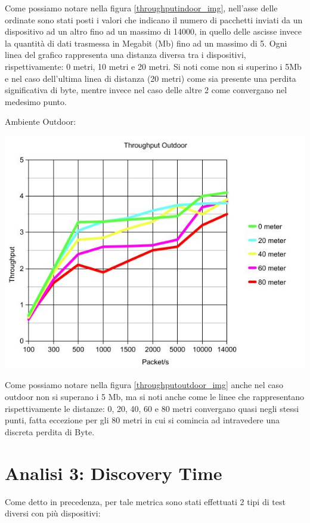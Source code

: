 Come possiamo notare nella figura \ref{throughputindoor_img}, nell'asse delle ordinate sono stati posti i valori che indicano il numero di pacchetti inviati da un dispositivo ad un altro fino ad un massimo di 14000, in quello delle ascisse invece la quantità di dati trasmessa in Megabit (Mb) fino ad un massimo di 5.
Ogni linea del grafico rappresenta una distanza diversa tra i dispositivi, rispettivamente: 0 metri, 10 metri e 20 metri.
Si noti come non si superino i 5Mb e nel caso dell'ultima linea di distanza (20 metri) come sia presente una perdita significativa di byte, mentre invece nel caso delle altre 2 come convergano nel medesimo punto.

Ambiente Outdoor:
\begin{center}
\includegraphics[width=1\textwidth]{imgs/ThroughputOutdoor.jpg}
\label{throughputoutdoor_img}%
\end{center}

Come possiamo notare nella figura \ref{throughputoutdoor_img} anche nel caso outdoor non si superano i 5 Mb, ma si noti anche come le linee che rappresentano rispettivamente le distanze: 0, 20, 40, 60 e 80 metri convergano quasi negli stessi punti, fatta eccezione per gli 80 metri in cui si comincia ad intravedere una discreta perdita di Byte.

\section{Analisi 3: Discovery Time}
Come detto in precedenza, per tale metrica sono stati effettuati 2 tipi di test diversi con più dispositivi: 

